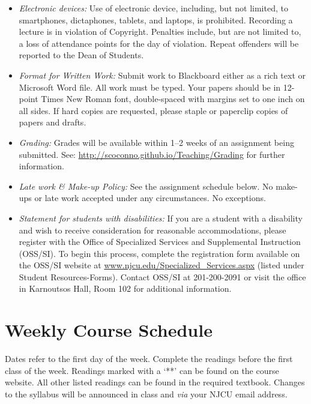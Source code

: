 \documentclass[article,oneside]{memoir}
\begin{document}
\begin{itemize}
\item \textit{Electronic devices:} Use of electronic device, including, but not limited, to smartphones, dictaphones, tablets, and laptops, is prohibited. Recording a lecture is in violation of Copyright. Penalties include, but are not limited to, a loss of attendance points for the day of violation. Repeat offenders will be reported to the Dean of Students.

\item \textit{Format for Written Work:} Submit work to Blackboard either as a rich text or Microsoft Word file. All work must be typed. Your papers should be in 12-point Times New Roman font, double-spaced with margins set to one inch on all sides. If hard copies are requested, please staple or paperclip copies of papers and drafts.



\item \textit{Grading:} Grades will be available within 1--2 weeks of an assignment being submitted. See: \href{http://scoconno.github.io/Teaching/Grading}{http://scoconno.github.io/Teaching/Grading} for further information.


\item \textit{Late work \& Make-up Policy:} See the assignment schedule below. No make-ups or late work accepted under any circumstances. No exceptions.


\item \textit{Statement for students with disabilities:} If you are a student with a disability and wish to receive consideration for reasonable accommodations, please register with the Office of Specialized Services and Supplemental Instruction (OSS/SI). To begin this process, complete the registration form available on the OSS/SI website at
\href{http://www.njcu.edu/Specialized_Services.aspx}{www.njcu.edu/Specialized\_Services.aspx}
(listed under Student Resources-Forms). Contact OSS/SI at 201-200-2091
or visit the office in Karnoutsos Hall, Room 102 for additional
information.

\end{itemize}



\section{Weekly Course Schedule}
Dates refer to the first day of the week. Complete the readings before the first class of the week. Readings marked with a `**' can be found on the course website. All other listed readings can be found in the required textbook. Changes to the syllabus will be announced in class and \emph{via} your NJCU email address.
\end{document}
